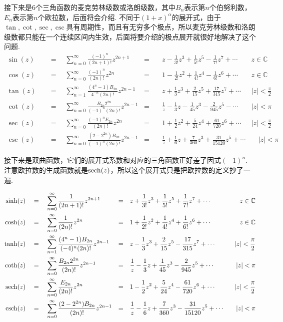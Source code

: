 \documentclass[main.tex]{subfiles}
\begin{document}
接下来是6个三角函数的麦克劳林级数或洛朗级数，其中\(B_n\)表示第\(n\)个伯努利数，\(E_n\)表示第\(n\)个欧拉数，后面将会介绍. 不同于\((1+x)^{\alpha}\)的展开式，由于\(\tan,\cot,\sec,\csc\)具有周期性，而且有无穷多个极点，所以麦克劳林级数和洛朗级数都只能在一个连续区间内生效，后面将要介绍的极点展开就很好地解决了这个问题.
\begin{align*}
    \sin(z)\quad&=\quad \sum_{n=0}^{\infty}\frac{(-1)^n}{(2n+1)!}z^{2n+1} &=&\quad z-\frac{1}{3!}z^3+\frac{1}{5!}z^5-\frac{1}{7!}z^7+\cdots & z \in \mathbb{C} \\
    \cos(z) \quad&=\quad \sum_{n=0}^{\infty}\frac{(-1)^n}{(2n)!}z^{2n} &=&\quad 1-\frac{1}{2!}z^2+\frac{1}{4!}z^4-\frac{1}{6!}z^6+\cdots & z \in \mathbb{C} \\
    \tan(z) \quad&=\quad \sum_{n=1}^{\infty}\frac{(4^{n}-1)B_{2n}}{4^{-n}(2n)!}z^{2n-1} &=&\quad z + \frac{1}{3}z^3 + \frac{2}{15}z^5 + \frac{17}{315}z^7+\cdots & |z|<\frac {\pi}{2} \\
    \cot(z) \quad&=\quad \sum_{n=0}^{\infty}\frac{B_{2n}2^{2n}}{(-1)^n(2n)!}z^{2n-1} &=&\quad \frac{1}{z}-\frac{1}{3}z-\frac{1}{45}z^3-\frac{2}{945}z^5-\cdots & |z|<{\pi} \\
    \sec(z) \quad&=\quad \sum_{n=0}^{\infty}\frac{(-1)^nE_{2n}}{(2n)!}z^{2n} &=&\quad 1+\frac{1}{2}z^2+\frac{5}{24}z^4+\frac{61}{720}z^6+\cdots & |z|<\frac{\pi}{2} \\
    \csc(z) \quad&=\quad \sum_{n=0}^{\infty}\frac{(2-2^{2n})B_{2n}}{(-1)^{n}(2n)!}z^{2n-1} &=&\quad \frac{1}{z} + \frac{1}{6}z + \frac{7}{360}z^3 + \frac{31}{15120}z^5 +\cdots & \quad |z|<\pi
\end{align*}

接下来是双曲函数，它们的展开式系数和对应的三角函数正好差了因式\((-1)^n\). 注意欧拉数的生成函数就是\({\rm sech}(z)\)，所以这个展开式只是把欧拉数的定义抄了一遍.

\begin{align*}
    \sinh(z) \quad&=\quad \sum_{n=0}^{\infty}\frac{1}{(2n+1)!}z^{2n+1} &=&\quad z+\frac{1}{3!}z^3+\frac{1}{5!}z^5+\frac{1}{7!}z^7+\cdots & z \in \mathbb{C} \\
    \cosh(z) \quad&=\quad \sum_{n=0}^{\infty}\frac{1}{(2n)!}z^{2n} &=&\quad 1+\frac{1}{2!}z^2+\frac{1}{4!}z^4+\frac{1}{6!}z^6+\cdots & z \in \mathbb{C} \\
    \tanh(z) \quad&=\quad \sum_{n=1}^{\infty}\frac{(4^{n}-1)B_{2n}}{(-4)^n(2n)!}z^{2n-1} &=&\quad z - \frac{1}{3}z^3 + \frac{2}{15}z^5 - \frac{17}{315}z^7+\cdots & |z|<\frac {\pi}{2} \\
    {\rm coth}(z) \quad&=\quad \sum_{n=0}^{\infty}\frac{B_{2n}2^{2n}}{(2n)!}z^{2n-1} &=&\quad \frac{1}{z}-\frac{1}{3}z+\frac{1}{45}z^3-\frac{2}{945}z^5+\cdots & |z|<{\pi} \\
    {\rm sech}(z) \quad&=\quad \sum_{n=0}^{\infty}\frac{E_{2n}}{(2n)!}z^{2n} &=&\quad 1-\frac{1}{2}z^2+\frac{5}{24}z^4-\frac{61}{720}z^6+\cdots & |z|<\frac{\pi}{2} \\
    {\rm csch}(z) \quad&=\quad \sum_{n=0}^{\infty}\frac{(2-2^{2n})B_{2n}}{(2n)!}z^{2n-1} &=&\quad \frac{1}{z} - \frac{1}{6}z + \frac{7}{360}z^3 - \frac{31}{15120}z^5 +\cdots & \quad |z|<\pi
\end{align*}
\end{document}
